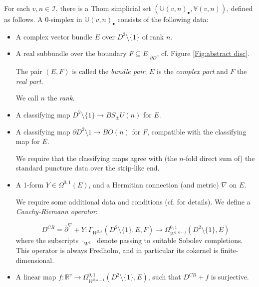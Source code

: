 \documentclass{TPmod}
\def\bR{\mathbb{R}}
\def\bU{\mathbb{U}}
\def\bV{\mathbb{V}}
\newcommand{\cI}{\mathcal{I}}
\numberwithin{equation}{section}
\begin{document}
    
    \begin{defn}\label{def: fix dom case}
        For each $v, n \in \cI$, there is a Thom simplicial set $(\bU(v, n)_\bullet, \bV(v, n))$, defined as follows. A $0$-simplex in $\bU(v,n)_\bullet$ consists of the following data:
        \begin{itemize}
            \item A complex vector bundle $E$ over $D^2\setminus\{1\}$ of rank $n$. 
            
            \item A real subbundle over the boundary $F \subseteq E|_{\partial D}$, cf. Figure \ref{Fig:abstract disc}. 

            The pair $(E, F)$ is called the \emph{bundle pair}; $E$ is the \emph{complex part} and $F$ the \emph{real part}.

            We call $n$ the \emph{rank}.

            \item A classifying map $D^2\setminus \{1\} \to BS_\pm U(n)$ for $E$.

            \item A classifying map $\partial D^2 \setminus 1 \to BO(n)$ for $F$, compatible with the classifying map for $E$. 

            We require that the classifying maps agree with (the $n$-fold direct sum of) the standard puncture data over the strip-like end.

            \item A 1-form $Y \in \Omega^{0,1}(E)$, and a Hermitian connection (and metric) $\nabla$ on $E$.
            
            We require some additional data and conditions (cf. \cite[Definition 3.9]{PS2} for details). We define a \emph{Cauchy-Riemann operator}:

            \begin{equation}
                D^{CR} = \overline\partial^\nabla + Y: \Gamma_{W^{2,\kappa}}\left(D^2\setminus \{1\}, E, F\right) \to \Omega^{0,1}_{W^{2,\kappa-1}}\left(D^2\setminus \{1\}, E\right)
            \end{equation}
            where the subscripts $\cdot_{W^{2,\cdot}}$ denote passing to suitable Sobolev completions. This operator is always Fredholm, and in particular its cokernel is finite-dimensional.

            \item A linear map $f: \bR^v \to \Omega^{0,1}_{W^{2,\kappa-1}}(D^2\setminus \{1\}, E)$, such that $D^{CR} + f$ is surjective. 
        \end{itemize}
        

\end{defn}
\end{document}
